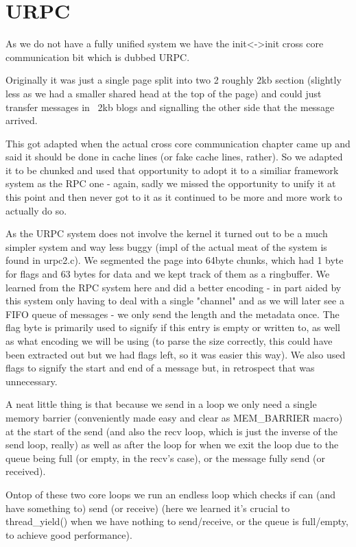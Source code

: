 \section{URPC}\label{s:URPC}

As we do not have a fully unified system we have the init<->init cross core 
communication bit which is dubbed URPC.
\medskip

Originally it was just a single page split into two 2 roughly 2kb section 
(slightly less as we had a smaller shared head at the top of the page) and 
could just transfer messages in ~2kb blogs and signalling the other side that 
the message arrived.
\medskip

This got adapted when the actual cross core communication chapter came up and 
said it should be done in cache lines (or fake cache lines, rather). So we 
adapted it to be chunked and used that opportunity to adopt it to a similiar 
framework system as the RPC one - again, sadly we missed the opportunity to 
unify it at this point and then never got to it as it continued to be more and 
more work to actually do so.
\medskip

As the URPC system does not involve the kernel it turned out to be a much 
simpler system and way less buggy (impl of the actual meat of the system is 
found in urpc2.c). We segmented the page into 64byte chunks, which had 1 byte 
for flags and 63 bytes for data and we kept track of them as a ringbuffer. We 
learned from the RPC system here and did a better encoding - in part aided by 
this system only having to deal with a single "channel" and as we will later 
see a FIFO queue of messages - we only send the length and the metadata once. 
The flag byte is primarily used to signify if this entry is empty or written 
to, as well as what encoding we will be using (to parse the size correctly, 
this could have been extracted out but we had flags left, so it was easier 
this way). We also used flags to signify the start and end of a message but, 
in retrospect that was unnecessary.
\medskip

A neat little thing is that because we send in a loop we only need a single 
memory barrier (conveniently made easy and clear as MEM\_BARRIER macro) at 
the start of the send (and also the recv loop, which is just the inverse of 
the send loop, really) as well as after the loop for when we exit the loop 
due to the queue being full (or empty, in the recv's case), or the message 
fully send (or received).
\medskip

Ontop of these two core loops we run an endless loop which checks if can 
(and have something to) send (or receive) (here we learned it's crucial to 
thread\_yield() when we have nothing to send/receive, or the queue is 
full/empty, to achieve good performance).
\medskip

